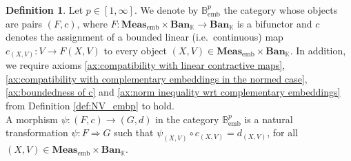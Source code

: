 \documentclass{amsart}
\theoremstyle{definition}
\newtheorem{definition}{Definition}[section]
\theoremstyle{plain}
\newcommand{\embMeas}{\mathbf{Meas}_\mathrm{emb}}
\newcommand{\Ban}{\mathbf{Ban}_{\mathbb{K}}}
\newcommand{\Bembp}{\mathbb{B}_{\mathrm{emb}}^p}
\begin{document}
        \begin{definition} 
        \label{def:Bemb}
            Let $p \in [1,\infty]$. 
            We denote by $\Bembp$ the category whose objects are pairs $(F,c)$, where $F \colon \embMeas \times \Ban \rightarrow \Ban$ is a bifunctor and $c$ denotes the assignment of a bounded linear (i.e.~continuous) map $c_{(X,V)} \colon V \rightarrow F(X,V)$ to every object $(X,V) \in \embMeas \times \Ban$. 
            In addition, we require axioms \ref{ax:compatibility with linear contractive maps}, \ref{ax:compatibility with complementary embeddings in the normed case}, \ref{ax:boundedness of c} and \ref{ax:norm inequality wrt complementary embeddings} from Definition \ref{def:NV_embp} to hold. \\
            A morphism $\psi \colon (F,c) \rightarrow (G,d)$ in the category $\Bembp$ is a natural transformation $\psi \colon F \Rightarrow G$ such that $\psi_{(X,V)} \circ c_{(X,V)} = d_{(X,V)}$, for all $(X,V) \in \embMeas \times \Ban$.
        \end{definition}
\end{document}
